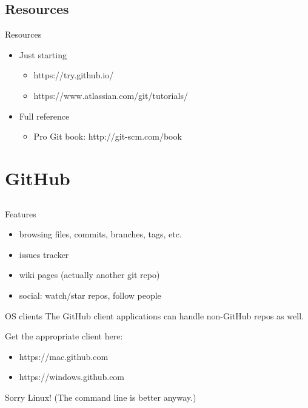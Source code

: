 \documentclass{beamer}
\begin{document}
\subsection{Resources}
\begin{frame}{Resources}
  \begin{itemize}
    \item Just starting
      \begin{itemize}
        \item https://try.github.io/
        \item https://www.atlassian.com/git/tutorials/
      \end{itemize}
    \item Full reference
      \begin{itemize}
        \item Pro Git book: http://git-scm.com/book
      \end{itemize}
  \end{itemize}
\end{frame}

\section{GitHub}
\subsection*{}

\begin{frame}{Features}
  \begin{itemize}
    \item browsing files, commits, branches, tags, etc.
    \item issues tracker
    \item wiki pages (actually another git repo)
    \item social: watch/star repos, follow people
  \end{itemize}
\end{frame}

\begin{frame}{OS clients}
The GitHub client applications can handle non-GitHub repos as well.

\vspace{1em}

Get the appropriate client here:
  \begin{itemize}
    \item https://mac.github.com
    \item https://windows.github.com
  \end{itemize}
Sorry Linux! (The command line is better anyway.)
\end{frame}
\end{document}
